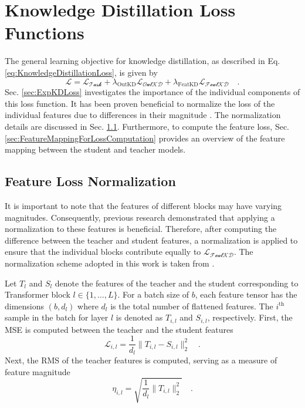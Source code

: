 \section{Knowledge Distillation Loss Functions}
\label{sec:MethodKDLoss}
The general learning objective for knowledge distillation, as described in Eq. \ref{eq:KnowledgeDistillationLoss}, is given by
\begin{equation}
	\mathcal{L} = \mathcal{L_\text{Task}} + \lambda_\text{OutKD} \mathcal{L_\text{OutKD}} + \lambda_\text{FeatKD} \mathcal{L_\text{FeatKD}} \quad.
\end{equation}
Sec. \ref{sec:ExpKDLoss} investigates the importance of the individual components of this loss function. It has been proven beneficial to normalize the loss of the individual features due to differences in their magnitude \cite{Laptop}. The normalization details are discussed in Sec.  \ref{sec:KDLNormalization}. Furthermore, to compute the feature loss, Sec. \ref{sec:FeatureMappingForLossComputation} provides an overview of the feature mapping between the student and teacher models.

\subsection{Feature Loss Normalization}
\label{sec:KDLNormalization}
It is important to note that the features of different blocks may have varying magnitudes. Consequently, previous research \cite{Laptop} demonstrated that applying a normalization to these features is beneficial. Therefore, after computing the difference between the teacher and student features, a normalization is applied to ensure that the individual blocks contribute equally to $\mathcal{L_\text{FeatKD}}$. The normalization scheme adopted in this work is taken from \cite{Dense2MoE}.

  Let $T_l$ and $S_l$ denote the features of the teacher and the student corresponding to Transformer block $l \in \{1,\dots,L\}$. For a batch size of $b$, each feature tensor has the dimensions $(b,d_l)$ where $d_l$ is the total number of flattened features. The $i^{\text{th}}$ sample in the batch for layer $l$ is denoted as $T_{i,l}$ and $S_{i,l}$, respectively.  
First, the \gls{MSE} is computed between the teacher and the student features 
\begin{equation}
\mathcal{L}_{i,l} = \frac{1}{d_l} \| T_{i,l} - S_{i,l}\|_2^2 \quad.
\end{equation}
Next, the \gls{RMS} of the teacher features is computed, serving as a measure of feature magnitude
\begin{equation}
 \eta_{i,l} = \sqrt{\frac{1}{d_l} \|T_{i,l}\|^2_2} \quad.
\end{equation}

